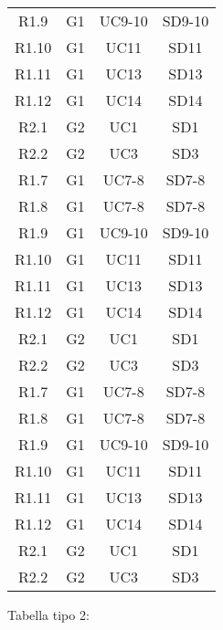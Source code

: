 \begin{longtable}{cccc}
    R1.9 & G1 & UC9-10 & SD9-10 \\
    R1.10 & G1 & UC11  & SD11 \\
    R1.11 & G1 & UC13  & SD13 \\
    R1.12 & G1 & UC14  & SD14 \\
    R2.1 & G2 & UC1    & SD1  \\
    R2.2 & G2 & UC3    & SD3  \\
    R1.7 & G1 & UC7-8  & SD7-8 \\
    R1.8 & G1 & UC7-8  & SD7-8 \\
    R1.9 & G1 & UC9-10 & SD9-10 \\
    R1.10 & G1 & UC11  & SD11 \\
    R1.11 & G1 & UC13  & SD13 \\
    R1.12 & G1 & UC14  & SD14 \\
    R2.1 & G2 & UC1    & SD1  \\
    R2.2 & G2 & UC3    & SD3  \\
    R1.7 & G1 & UC7-8  & SD7-8 \\
    R1.8 & G1 & UC7-8  & SD7-8 \\
    R1.9 & G1 & UC9-10 & SD9-10 \\
    R1.10 & G1 & UC11  & SD11 \\
    R1.11 & G1 & UC13  & SD13 \\
    R1.12 & G1 & UC14  & SD14 \\
    R2.1 & G2 & UC1    & SD1  \\
    R2.2 & G2 & UC3    & SD3  \\
    \end{longtable}
    
    Tabella tipo 2:

